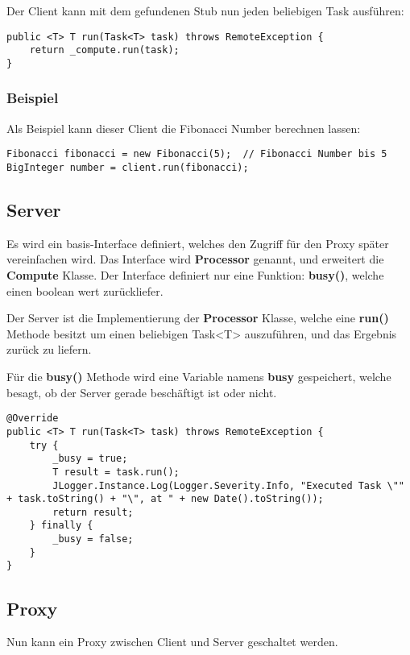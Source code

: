 Der Client kann mit dem gefundenen Stub nun jeden beliebigen Task ausführen:

\begin{lstlisting}[style=Java, caption=Client Implementation - Task run]
public <T> T run(Task<T> task) throws RemoteException {
    return _compute.run(task);
}
\end{lstlisting}

\subsubsection{Beispiel}

Als Beispiel kann dieser Client die Fibonacci Number berechnen lassen:

\begin{lstlisting}[style=Java, caption=Client Implementation - Fibonacci Beispiel]
Fibonacci fibonacci = new Fibonacci(5);  // Fibonacci Number bis 5
BigInteger number = client.run(fibonacci);
\end{lstlisting}

\subsection{Server}
Es wird ein basis-Interface definiert, welches den Zugriff für den Proxy später vereinfachen wird. Das Interface wird \textbf{Processor} genannt, und erweitert die \textbf{Compute} Klasse. 
Der Interface definiert nur eine Funktion: \textbf{busy()}, welche einen boolean wert zurückliefer.

Der Server ist die Implementierung der \textbf{Processor} Klasse, welche eine \textbf{run()} Methode besitzt um einen beliebigen Task<T> auszuführen, und das Ergebnis zurück zu liefern.

Für die \textbf{busy()} Methode wird eine Variable namens \textbf{busy} gespeichert, welche besagt, ob der Server gerade beschäftigt ist oder nicht.

\begin{lstlisting}[style=Java, caption=Server Implementation - run Methode]
@Override
public <T> T run(Task<T> task) throws RemoteException {
	try {
    	_busy = true;
        T result = task.run();
        JLogger.Instance.Log(Logger.Severity.Info, "Executed Task \"" + task.toString() + "\", at " + new Date().toString());
		return result;
    } finally {
    	_busy = false;
    }
}
\end{lstlisting}


\subsection{Proxy}
Nun kann ein Proxy zwischen Client und Server geschaltet werden.

